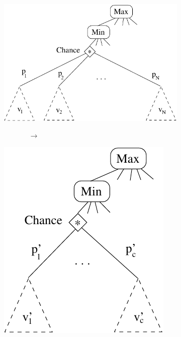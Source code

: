 \documentclass{article}
\begin{document}
\begin{figure}[t!]
        \centering
        \begin{subfigure}[m]{0.4\textwidth}
                \centering
                \includegraphics[width=\textwidth]{example}
        \end{subfigure}%
        ~~~~~~~~~~~~ $\rightarrow$ ~~~~~~~~~~~~
        \begin{subfigure}[m]{0.23\textwidth}
                \centering
                \includegraphics[width=\textwidth]{example2}

\end{subfigure}
\end{figure}
\end{document}
